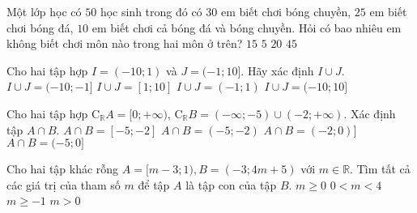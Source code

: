 \begin{ex}%
	Một lớp học có $ 50 $ học sinh trong đó có $ 30 $ em biết chơi bóng chuyền, $ 25 $ em biết chơi bóng đá, $ 10 $ em biết chơi cả bóng đá và bóng chuyền. Hỏi có bao nhiêu em không biết chơi môn nào trong hai môn ở trên?
	\choice
	{$ 15 $}
	{\True$ 5 $}
	{$ 20 $}
	{$ 45 $}	
\end{ex}
\begin{ex}%
	Cho hai tập hợp $I=(-10;1)$ và $J=(-1;10]$. Hãy xác định $I\cup J.$
	\choice
	{$I\cup J=(-10;-1]$}
	{$I\cup J=[1;10]$}
	{$I\cup J=(-1;1)$}
	{\True $I\cup J=(-10;10]$}
	\loigiai{
		Ta có $I\cup J=(-10;10].$
	}
\end{ex}
\begin{ex}%
	Cho hai tập hợp $\mathrm{C}_\mathbb{R}A=[0;+\infty)$, $\mathrm{C}_\mathbb{R}B=(-\infty;-5)\cup (-2;+\infty)$. Xác định tập $A\cap B$.
	\choice
	{\True $A\cap B=[-5;-2]$}
	{$A\cap B=(-5;-2)$}
	{$A\cap B=(-2;0)]$}
	{$A\cap B=(-5;0]$}
	\loigiai{
		$\mathrm{C}_\mathbb{R}A=[0;+\infty)\Rightarrow A=(-\infty;0)$, $\mathrm{C}_\mathbb{R}B=(-\infty;-5)\cup (-2;+\infty)\Rightarrow B=[-5;-2]$.\\
		Do đó $A\cap B=[-5;-2]$.
	}
\end{ex}
\begin{ex}%
	Cho hai tập khác rỗng $ A=[m-3; 1), B=(-3; 4m+5) $ với $ m\in\mathbb{R} $. Tìm tất cả các giá trị của tham số $ m $ để tập $ A $ là tập con của tập $ B $.
	\choice
	{$ m\geq 0 $}
	{\True $ 0<m<4 $}
	{$ m\geq -1 $}
	{$ m>0 $}
\end{ex}
